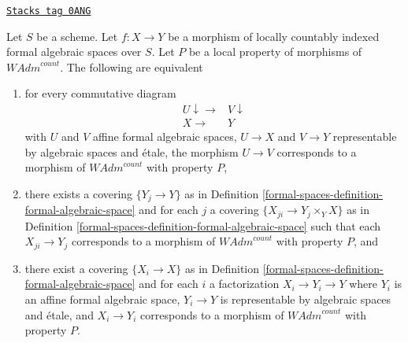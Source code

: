 \begin{lemma}
\label{formal-spaces-lemma-property-defines-property-morphisms}
\href{https://stacks.math.columbia.edu/tag/0ANG}{\texttt{Stacks tag 0ANG}}

Let $S$ be a scheme. Let $f : X \to Y$ be a morphism of
locally countably indexed formal algebraic spaces over $S$.
Let $P$ be a local property of morphisms of $\textit{WAdm}^{count}$.
The following are equivalent
\begin{enumerate}
\item for every commutative diagram
$$
\begin{array}{cc}U \downarrow\longrightarrow & V \downarrow \\ X \longrightarrow & Y\end{array}
$$
with $U$ and $V$ affine formal algebraic spaces, $U \to X$ and $V \to Y$
representable by algebraic spaces and \'etale, the morphism $U \to V$
corresponds to a morphism of $\textit{WAdm}^{count}$ with property $P$,
\item there exists a covering $\{Y_j \to Y\}$ as in
Definition \ref{formal-spaces-definition-formal-algebraic-space} and for each $j$
a covering $\{X_{ji} \to Y_j \times_Y X\}$ as in
Definition \ref{formal-spaces-definition-formal-algebraic-space}
such that each $X_{ji} \to Y_j$  corresponds
to a morphism of $\textit{WAdm}^{count}$ with property $P$, and
\item there exist a covering $\{X_i \to X\}$ as in
Definition \ref{formal-spaces-definition-formal-algebraic-space}
and for each $i$ a factorization $X_i \to Y_i \to Y$ where $Y_i$
is an affine formal algebraic space, $Y_i \to Y$ is representable
by algebraic spaces and \'etale, and $X_i \to Y_i$ corresponds
to a morphism of $\textit{WAdm}^{count}$ with property $P$.
\end{enumerate}
\end{lemma}

